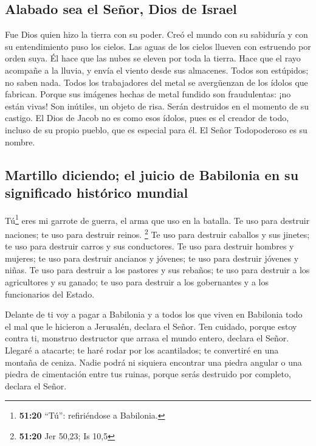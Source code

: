 \hypertarget{alabado-sea-el-seuxf1or-dios-de-israel}{%
\subsection{Alabado sea el Señor, Dios de
Israel}\label{alabado-sea-el-seuxf1or-dios-de-israel}}

 Fue Dios quien hizo la tierra con su poder. Creó el
mundo con su sabiduría y con su entendimiento puso los cielos.
 Las aguas de los cielos llueven con estruendo por orden
suya. Él hace que las nubes se eleven por toda la tierra. Hace que el
rayo acompañe a la lluvia, y envía el viento desde sus almacenes.
 Todos son estúpidos; no saben nada. Todos los
trabajadores del metal se avergüenzan de los ídolos que fabrican. Porque
sus imágenes hechas de metal fundido son fraudulentas: ¡no están vivas!
 Son inútiles, un objeto de risa. Serán destruidos en el
momento de su castigo.  El Dios de Jacob no es como esos
ídolos, pues es el creador de todo, incluso de su propio pueblo, que es
especial para él. El Señor Todopoderoso es su nombre.

\hypertarget{martillo-diciendo-el-juicio-de-babilonia-en-su-significado-histuxf3rico-mundial}{%
\subsection{Martillo diciendo; el juicio de Babilonia en su significado
histórico
mundial}\label{martillo-diciendo-el-juicio-de-babilonia-en-su-significado-histuxf3rico-mundial}}

 Tú\footnote{\textbf{51:20} ``Tú'': refiriéndose a
  Babilonia.} eres mi garrote de guerra, el arma que uso en la batalla.
Te uso para destruir naciones; te uso para destruir reinos. \footnote{\textbf{51:20}
  Jer 50,23; Is 10,5}  Te uso para destruir caballos y
sus jinetes; te uso para destruir carros y sus conductores.
 Te uso para destruir hombres y mujeres; te uso para
destruir ancianos y jóvenes; te uso para destruir jóvenes y niñas.
 Te uso para destruir a los pastores y sus rebaños; te
uso para destruir a los agricultores y su ganado; te uso para destruir a
los gobernantes y a los funcionarios del Estado.

 Delante de ti voy a pagar a Babilonia y a todos los que
viven en Babilonia todo el mal que le hicieron a Jerusalén, declara el
Señor.  Ten cuidado, porque estoy contra ti, monstruo
destructor que arrasa el mundo entero, declara el Señor. Llegaré a
atacarte; te haré rodar por los acantilados; te convertiré en una
montaña de ceniza.  Nadie podrá ni siquiera encontrar una
piedra angular o una piedra de cimentación entre tus ruinas, porque
serás destruido por completo, declara el Señor.

